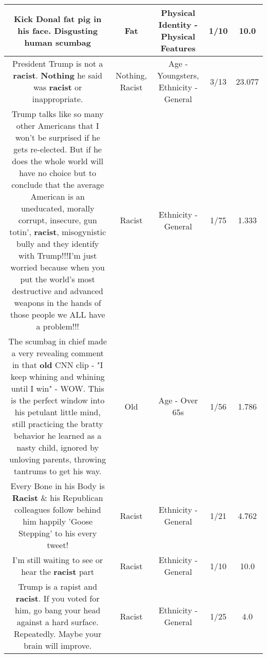 \documentclass[11pt]{article}
\newlength\mylength
\begin{document}
\begin{center}
\begin{longtable}{|C{.65\mylength}|C{.30\mylength}|C{.12\mylength}|C{.12\mylength}|C{.12\mylength}|}
  \small Kick Donal \textbf{fat} pig in his face. Disgusting human scumbag\normalsize   & Fat & Physical Identity - Physical Features & 1/10 & 10.0 \\  \hline
  \small President Trump is not a \textbf{racist}.  \textbf{Nothing} he said was \textbf{racist} or inappropriate.\normalsize   & Nothing, Racist & Age - Youngsters, Ethnicity - General & 3/13 & 23.077 \\  \hline
  \small Trump talks like so many other Americans that I won't be surprised if he gets re-elected. But if he does the whole world will have no choice but to conclude that the average American is an uneducated, morally corrupt, insecure, gun totin', \textbf{racist}, misogynistic bully and they identify with Trump!!!I'm just worried because when you put the world's most destructive and advanced weapons in the hands of those people we ALL have a problem!!!\normalsize   & Racist & Ethnicity - General & 1/75 & 1.333 \\  \hline
  \small The scumbag in chief made a very revealing comment in that \textbf{old} CNN clip - "I keep whining and whining until I win" - WOW.  This is the perfect window into his petulant little mind, still practicing the bratty behavior he learned as a nasty child, ignored by unloving parents, throwing tantrums to get his way.\normalsize   & Old & Age - Over 65s & 1/56 & 1.786 \\  \hline
  \small Every Bone in his Body is \textbf{Racist} \& his Republican colleagues follow behind him happily 'Goose Stepping' to his every tweet!\normalsize   & Racist & Ethnicity - General & 1/21 & 4.762 \\  \hline
  \small I'm still waiting to see or hear the \textbf{racist} part\normalsize   & Racist & Ethnicity - General & 1/10 & 10.0 \\  \hline
  \small Trump is a rapist and \textbf{racist}. If you voted for him, go bang your head against a hard surface. Repeatedly. Maybe your brain will improve.\normalsize   & Racist & Ethnicity - General & 1/25 & 4.0 \\  \hline

\end{longtable}
\end{center}
\end{document}
